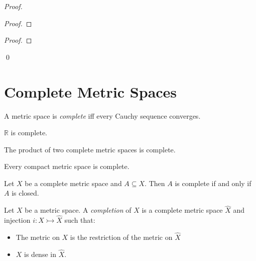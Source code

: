 \begin{proof}
\pf
{}
\begin{proof}
\end{proof}
\begin{proof}
\end{proof}
\qed
\end{proof}

\section{Complete Metric Spaces}

\begin{df}[Complete]
A metric space is \emph{complete} iff every Cauchy sequence converges.
\end{df}

\begin{ex}
$\mathbb{R}$ is complete.
\end{ex}

\begin{prop}
The product of two complete metric spaces is complete.
\end{prop}

\begin{prop}
Every compact metric space is complete.
\end{prop}

\begin{prop}
Let $X$ be a complete metric space and $A \subseteq X$. Then $A$ is complete if and only if $A$ is closed.
\end{prop}

\begin{df}[Completion]
Let $X$ be a metric space. A \emph{completion} of $X$ is a complete metric space $\hat{X}$ and injection $i : X \rightarrowtail \hat{X}$ such that:
\begin{itemize}
\item The metric on $X$ is the restriction of the metric on $\hat{X}$
\item $X$ is dense in $\hat{X}$.
\end{itemize}
\end{df}

